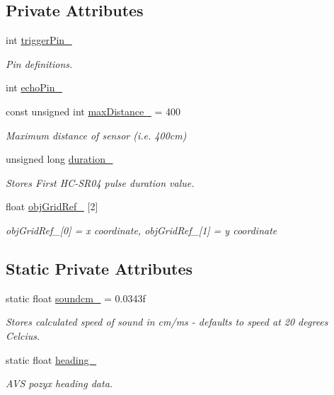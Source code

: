 \subsection*{Private Attributes}
\begin{DoxyCompactItemize}
\item 
int \mbox{\hyperlink{class_obstacle_sensor_a8bda5595b38379dd74e1c4c7204ad0af}{trigger\+Pin\+\_\+}}
\begin{DoxyCompactList}\small\item\em Pin definitions. \end{DoxyCompactList}\item 
int \mbox{\hyperlink{class_obstacle_sensor_ace6d2e5d6aa6e7a8feb801b64310df12}{echo\+Pin\+\_\+}}
\item 
const unsigned int \mbox{\hyperlink{class_obstacle_sensor_af980bd4eda58b827f559b0264295c338}{max\+Distance\+\_\+}} = 400
\begin{DoxyCompactList}\small\item\em Maximum distance of sensor (i.\+e. 400cm) \end{DoxyCompactList}\item 
unsigned long \mbox{\hyperlink{class_obstacle_sensor_aa206d6a1ab58f0a98fe00107b80cf764}{duration\+\_\+}}
\begin{DoxyCompactList}\small\item\em Stores First H\+C-\/\+S\+R04 pulse duration value. \end{DoxyCompactList}\item 
float \mbox{\hyperlink{class_obstacle_sensor_a8a5ed0513f7190c94f6362dc8e3f422d}{obj\+Grid\+Ref\+\_\+}} \mbox{[}2\mbox{]}
\begin{DoxyCompactList}\small\item\em obj\+Grid\+Ref\+\_\+\mbox{[}0\mbox{]} = x coordinate, obj\+Grid\+Ref\+\_\+\mbox{[}1\mbox{]} = y coordinate \end{DoxyCompactList}\end{DoxyCompactItemize}
\subsection*{Static Private Attributes}
\begin{DoxyCompactItemize}
\item 
static float \mbox{\hyperlink{class_obstacle_sensor_ae6d0b250f37a34d04103d43e4e4e0082}{soundcm\+\_\+}} = 0.\+0343f
\begin{DoxyCompactList}\small\item\em Stores calculated speed of sound in cm/ms -\/ defaults to speed at 20 degrees Celcius. \end{DoxyCompactList}\item 
static float \mbox{\hyperlink{class_obstacle_sensor_add4a6ffaf43bcdd08e1a8c0c3956605d}{heading\+\_\+}}
\begin{DoxyCompactList}\small\item\em A\+VS pozyx heading data. \end{DoxyCompactList}\end{DoxyCompactItemize}


